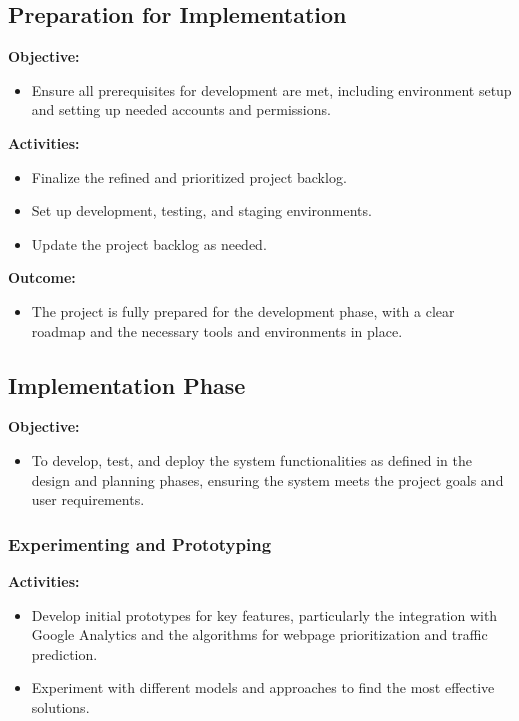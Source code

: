 \documentclass[12pt,a4paper]{article}
\begin{document}
\subsection{Preparation for Implementation}

\noindent \textbf{Objective:}
\begin{itemize}
    \item Ensure all prerequisites for development are met, including environment setup and setting up needed accounts and permissions.
\end{itemize}

\noindent \textbf{Activities:}
\begin{itemize}
    \item Finalize the refined and prioritized project backlog.
    \item Set up development, testing, and staging environments.
    \item Update the project backlog as needed.
\end{itemize}

\noindent \textbf{Outcome:}
\begin{itemize}
    \item The project is fully prepared for the development phase, with a clear roadmap and the necessary tools and environments in place.
\end{itemize}

\subsection{Implementation Phase}

\noindent \textbf{Objective:}
\begin{itemize}
    \item To develop, test, and deploy the system functionalities as defined in the design and planning phases, ensuring the system meets the project goals and user requirements.
\end{itemize}
\subsubsection{Experimenting and Prototyping}

\noindent \textbf{Activities:}
\begin{itemize}
    \item Develop initial prototypes for key features, particularly the integration with Google Analytics and the algorithms for webpage prioritization and traffic prediction.
    \item Experiment with different models and approaches to find the most effective solutions.
\end{itemize}
\end{document}
